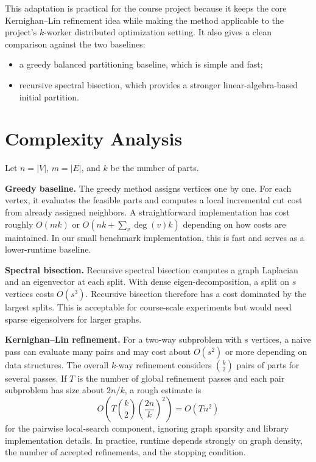 \documentclass[11pt]{article}
\begin{document}
This adaptation is practical for the course project because it keeps the core
Kernighan--Lin refinement idea while making the method applicable to the
project's $k$-worker distributed optimization setting. It also gives a clean
comparison against the two baselines:
\begin{itemize}
    \item a greedy balanced partitioning baseline, which is simple and fast;
    \item recursive spectral bisection, which provides a stronger
    linear-algebra-based initial partition.
\end{itemize}

\section{Complexity Analysis}

Let $n=|V|$, $m=|E|$, and $k$ be the number of parts.

\textbf{Greedy baseline.}
The greedy method assigns vertices one by one. For each vertex, it evaluates
the feasible parts and computes a local incremental cut cost from already
assigned neighbors. A straightforward implementation has cost roughly
$O(mk)$ or $O(nk+\sum_v \deg(v)k)$ depending on how costs are maintained. In
our small benchmark implementation, this is fast and serves as a lower-runtime
baseline.

\textbf{Spectral bisection.}
Recursive spectral bisection computes a graph Laplacian and an eigenvector at
each split. With dense eigen-decomposition, a split on $s$ vertices costs
$O(s^3)$. Recursive bisection therefore has a cost dominated by the largest
splits. This is acceptable for course-scale experiments but would need sparse
eigensolvers for larger graphs.

\textbf{Kernighan--Lin refinement.}
For a two-way subproblem with $s$ vertices, a naive pass can evaluate many
pairs and may cost about $O(s^2)$ or more depending on data structures. The
overall $k$-way refinement considers $\binom{k}{2}$ pairs of parts for several
passes. If $T$ is the number of global refinement passes and each pair
subproblem has size about $2n/k$, a rough estimate is
\[
    O\left(T \binom{k}{2}\left(\frac{2n}{k}\right)^2\right)
    =
    O(Tn^2)
\]
for the pairwise local-search component, ignoring graph sparsity and library
implementation details. In practice, runtime depends strongly on graph density,
the number of accepted refinements, and the stopping condition.
\end{document}

